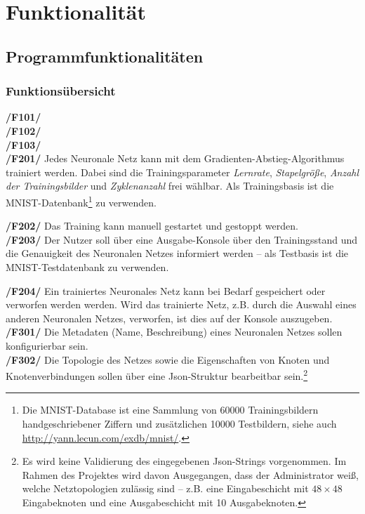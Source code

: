 \section{Funktionalität}

\subsection{Programmfunktionalitäten}
\subsubsection{Funktionsübersicht}

\textbf{/F101/}\\[-0.2cm]

\textbf{/F102/}\\[-0.2cm]

\textbf{/F103/}\\[-0.2cm]

\textbf{/F201/} Jedes Neuronale Netz kann mit dem Gradienten-Abstieg-Algorithmus trainiert werden. Dabei sind die Trainingsparameter \emph{Lernrate}, \emph{Stapelgröße}, \emph{Anzahl der Trainingsbilder} und \emph{Zyklenanzahl} frei wählbar. Als Trainingsbasis ist die MNIST-Datenbank\footnote{Die MNIST-Database ist eine Sammlung von 60000 Trainingsbildern handgeschriebener Ziffern und zusätzlichen 10000 Testbildern, siehe auch \url{http://yann.lecun.com/exdb/mnist/}.} zu verwenden.

\textbf{/F202/} Das Training kann manuell gestartet und gestoppt werden.\\[-0.2cm]

\textbf{/F203/} Der Nutzer soll über eine Ausgabe-Konsole über den Trainingsstand und die Genauigkeit des Neuronalen Netzes informiert werden -- als Testbasis ist die MNIST-Testdatenbank zu verwenden.

\textbf{/F204/} Ein trainiertes Neuronales Netz kann bei Bedarf gespeichert oder verworfen werden werden. Wird das trainierte Netz, z.B. durch die Auswahl eines anderen Neuronalen Netzes, verworfen, ist dies auf der Konsole auszugeben. \\[-0.2cm]

\textbf{/F301/} Die Metadaten (Name, Beschreibung) eines Neuronalen Netzes sollen konfigurierbar sein.\\[-0.2cm]

\textbf{/F302/} Die Topologie des Netzes sowie die Eigenschaften von Knoten und Knotenverbindungen sollen über eine Json-Struktur bearbeitbar sein.\footnote{Es wird keine Validierung des eingegebenen Json-Strings vorgenommen. Im Rahmen des Projektes wird davon Ausgegangen, dass der Administrator weiß, welche Netztopologien zulässig sind -- z.B. eine Eingabeschicht mit $48 \times 48$ Eingabeknoten und eine Ausgabeschicht mit 10 Ausgabeknoten.}\\[-0.2cm]


